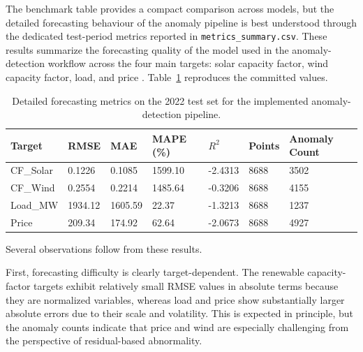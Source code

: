 The benchmark table provides a compact comparison across models, but the detailed forecasting behaviour of the anomaly pipeline is best understood through the dedicated test-period metrics reported in \texttt{metrics\_summary.csv}. These results summarize the forecasting quality of the model used in the anomaly-detection workflow across the four main targets: solar capacity factor, wind capacity factor, load, and price \cite{repo_thesis_grid_anomaly}. Table~\ref{tab:metrics_summary_ch71} reproduces the committed values.

\begin{table}[H]
	\centering
	\caption{Detailed forecasting metrics on the 2022 test set for the implemented anomaly-detection pipeline.}
	\label{tab:metrics_summary_ch71}
	\small
	\begin{tabular}{|p{2.2cm}|p{1.6cm}|p{1.6cm}|p{2.0cm}|p{1.5cm}|p{1.6cm}|p{2.5cm}|}
		\hline
		\textbf{Target} & \textbf{RMSE} & \textbf{MAE} & \textbf{MAPE (\%)} & \textbf{$R^2$} & \textbf{Points} & \textbf{Anomaly Count} \\
		\hline
		CF\_Solar & 0.1226 & 0.1085 & 1599.10 & -2.4313 & 8688 & 3502 \\
		\hline
		CF\_Wind & 0.2554 & 0.2214 & 1485.64 & -0.3206 & 8688 & 4155 \\
		\hline
		Load\_MW & 1934.12 & 1605.59 & 22.37 & -1.3213 & 8688 & 1237 \\
		\hline
		Price & 209.34 & 174.92 & 62.64 & -2.0673 & 8688 & 4927 \\
		\hline
	\end{tabular}
\end{table}

Several observations follow from these results.

First, forecasting difficulty is clearly target-dependent. The renewable capacity-factor targets exhibit relatively small RMSE values in absolute terms because they are normalized variables, whereas load and price show substantially larger absolute errors due to their scale and volatility. This is expected in principle, but the anomaly counts indicate that price and wind are especially challenging from the perspective of residual-based abnormality.

